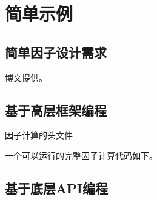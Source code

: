\chapter{简单示例}
\section{简单因子设计需求}
\large{博文提供}\normalsize。
\section{基于高层框架编程}


\large{因子计算的头文件}\normalsize 




一个可以运行的完整因子计算代码如下。


\section{基于底层API编程}

